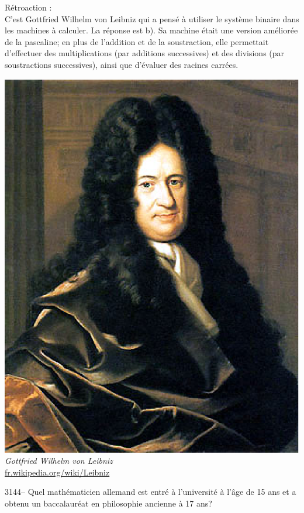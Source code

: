 \documentclass[letterpaper, 12pt]{article}
\begin{document}
R\'etroaction :\\
C'est Gottfried Wilhelm von Leibniz qui a pens\'e \`a utiliser le syst\`eme binaire dans les machines \`a calculer. La r\'eponse est b). Sa machine \'etait une version am\'elior\'ee de la pascaline; en plus de l'addition et de la soustraction, elle permettait d'effectuer des multiplications (par additions successives) et des divisions (par soustractions successives), ainsi que d'\'evaluer des racines carr\'ees.
\begin{center}
\includegraphics[scale=0.25]{Leibniz.eps}\\
\emph{{\small Gottfried Wilhelm von Leibniz}}\\
\href{http://fr.wikipedia.org/wiki/Leibniz}{fr.wikipedia.org/wiki/Leibniz}\\[5mm]
\end{center}



3144-- Quel math\'ematicien allemand est entr\'e \`a l'universit\'e \`a l'\^age de 15 ans et a obtenu un baccalaur\'eat en philosophie ancienne \`a 17 ans?\\
\end{document}
